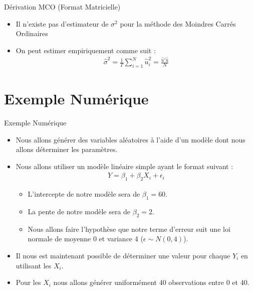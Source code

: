 \documentclass{beamer}
\begin{document}
\begin{frame}{Dérivation MCO (Format Matricielle)}
\begin{itemize}
  \item Il n'existe pas d'estimateur de \( \sigma^2 \) pour la méthode des Moindres Carrés Ordinaires 
  \item On peut estimer empiriquement comme suit :
  \begin{align*}
    \hat{\sigma}^2 = \frac{1}{T} \sum_{i=1}^N \hat{u}_i^2 = \frac{\hat{u}'\hat{u}}{N}
  \end{align*}
\end{itemize}
\end{frame}

\section{Exemple Numérique}
\frame{\tableofcontents[current]}

\begin{frame}{Exemple Numérique}
\begin{itemize}
  \item Nous allons générer des variables aléatoires à l’aide d’un modèle dont nous allons déterminer les paramètres.
  \item Nous allons utiliser un modèle linéaire simple ayant le format suivant :
  \begin{align*}
    Y = \beta_1 + \beta_2 X_i + \epsilon_i
  \end{align*}
  \begin{itemize}
    \item L'intercepte de notre modèle sera de \( \beta_1 = 60 \).
    \item La pente de notre modèle sera de \( \beta_2 = 2 \).
    \item Nous allons faire l'hypothèse que notre terme d'erreur suit une loi normale de moyenne 0 et variance 4 (\( \epsilon \sim N(0,4) \)).
  \end{itemize}
  \item Il nous est maintenant possible de déterminer une valeur pour chaque \( Y_i \) en utilisant les \( X_i \).
  \item Pour les \( X_i \) nous allons générer uniformément 40 observations entre 0 et 40. 
\end{itemize}
\end{frame}
\end{document}
